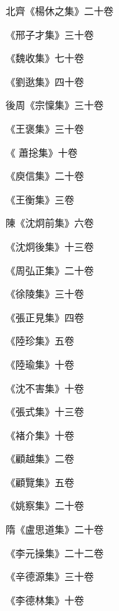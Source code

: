 \begin{pinyinscope}
 北齊《楊休之集》二十卷



 《邢子才集》三十卷



 《魏收集》七十卷



 《劉逖集》四十卷



 後周《宗懍集》三十卷



 《王褒集》三十卷



 《
 蕭捴集》十卷



 《庾信集》二十卷



 《王衡集》三卷



 陳《沈炯前集》六卷



 《沈炯後集》十三卷



 《周弘正集》二十卷



 《徐陵集》三十卷



 《張正見集》四卷



 《陸珍集》五卷



 《陸瑜集》十卷



 《沈不害集》十卷



 《張式集》十三卷



 《褚介集》十卷



 《顧越集》二卷



 《顧覽集》五卷



 《姚察集》二十卷



 隋《盧思道集》二十卷



 《李元操集》二十二卷



 《辛德源集》三十卷



 《李德林集》十卷




\end{pinyinscope}

